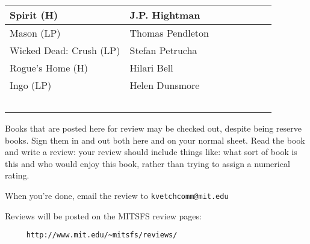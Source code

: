 \documentclass{article}
\begin{document}
\begin{center}
\begin{adjustwidth}{-2cm}{-2cm}
\begin{center}
\begin{tabular}{|p{2.7in}|p{1.3in}|c|p{1in}|c|c|c|c|}
Spirit (H) & J.P. Hightman &&&&&& \\ \hline
Mason (LP) & Thomas Pendleton &&&&&& \\ \hline
Wicked Dead: Crush (LP) & Stefan Petrucha &&&&&& \\ \hline
Rogue's Home (H) & Hilari Bell &&&&&& \\ \hline
Ingo (LP) & Helen Dunsmore &&&&&& \\ \hline

&&&&&&& \\ \hline
&&&&&&& \\ \hline
&&&&&&& \\ \hline
&&&&&&& \\ \hline
&&&&&&& \\ \hline
\end{tabular}

\end{center}
\end{adjustwidth}

\end{center}

\vspace{1cm}

\begin{Large}
Books that are posted here for review may be checked out, despite
being reserve books.  Sign them in and out both here and on your
normal sheet.  Read the book and write a review: your review should
include things like:
what sort of book is this
and who would enjoy this book,
rather than trying to assign a numerical rating.

When you're done, email the review to {\tt kvetchcomm@mit.edu}

Reviews will be posted on the MITSFS review pages:

\begin{verbatim}
     http://www.mit.edu/~mitsfs/reviews/
\end{verbatim}

\end{Large}
\end{document}
